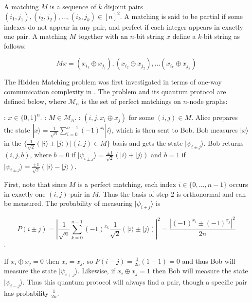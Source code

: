 \documentclass[a4paper]{article}
\begin{document}
        A matching $M$ is a sequence of $k$ disjoint pairs $(i_1, j_1), (i_2, j_2),...,(i_k, j_k) \in [n]^2$. A matching is said to be partial if some indexes do not appear in any pair, and perfect if each integer appears in exactly one pair. A matching $M$ together with an $n$-bit string $x$ define a $k$-bit string as follows:

        $$Mx = (x_{i_1} \oplus x_{j_1}), (x_{i_2} \oplus x_{j_2}), ... (x_{i_k} \oplus x_{j_k})$$

        The Hidden Matching problem was first investigated in terms of one-way communication complexity in \cite{doi:10.1137/060651835}. The problem and its quantum protocol are defined below, where $\mathcal{M}_n$ is the set of perfect matchings on $n$-node graphs:

        \begin{codebox}
            \zi {}: $x \in \{0,1\}^n$.
            \zi {}: $M \in \mathcal{M}_n$.
            \zi {}: $(i, j, x_i\oplus x_j)$ for some $(i, j) \in M$.
            \li Alice prepares the state $|x\rangle = \frac{1}{\sqrt{n}}\sum_{i = 0}^{n - 1}(-1)^{x_i}|i\rangle$, which is then sent to Bob.
            \li Bob measures $|x\rangle$ in the $\{\frac{1}{\sqrt{2}}(|i\rangle\pm|j\rangle)|(i, j) \in M\}$ basis and gets the state $|\psi_{i\pm j}\rangle$.
            \li Bob returns $(i, j, b)$, where $b = 0$ if $|\psi_{i\pm j}\rangle = \frac{\pm 1}{\sqrt{2}}(|i\rangle+|j\rangle)$ and $b = 1$ if $|\psi_{i\pm j}\rangle = \frac{\pm 1}{\sqrt{2}}(|i\rangle-|j\rangle)$.
        \end{codebox}

        First, note that since $M$ is a perfect matching, each index $i \in \{0,...,n-1\}$ occurs in exactly one $(i, j)$-pair in $M$. Thus the basis of step $2$ is orthonormal and can be measured. The probability of measuring $|\psi_{i \pm j}\rangle$ is

        $$P(i\pm j) = \left|\frac{1}{\sqrt{n}}\sum_{k=0}^{n-1}(-1)^{x_k}\frac{1}{\sqrt{2}}(|i\rangle \pm |j\rangle)\right|^2 = \frac{|(-1)^{x_i} \pm (-1)^{x_j}|^2}{2n}$$.

        If $x_i \oplus x_j = 0$ then $x_i = x_j$, so $P(i-j) = \frac{1}{2n}(1-1) = 0$ and thus Bob will measure the state $|\psi_{i+j}\rangle$. Likewise, if $x_i \oplus x_j = 1$ then Bob will measure the state $|\psi_{i-j}\rangle$. Thus this quantum protocol will always find a pair, though a specific pair has probability $\frac{1}{2n}$.
\end{document}
